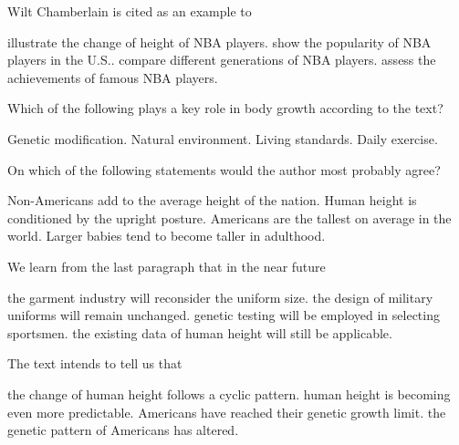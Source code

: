 \item Wilt Chamberlain is cited as an example to
\begin{tasks}
	\task illustrate the change of height of NBA players.
	\task show the popularity of NBA players in the U.S..
	\task compare different generations of NBA players.
	\task assess the achievements of famous NBA players.
\end{tasks}
\item Which of the following plays a key role in body growth according to the text?
\begin{tasks}
	\task Genetic modification.
	\task Natural environment.
	\task Living standards.
	\task Daily exercise.
\end{tasks}
\item On which of the following statements would the author most probably agree?
\begin{tasks}
	\task Non-Americans add to the average height of the nation.
	\task Human height is conditioned by the upright posture.
	\task Americans are the tallest on average in the world.
	\task Larger babies tend to become taller in adulthood.
\end{tasks}
\item We learn from the last paragraph that in the near future
\begin{tasks}
	\task the garment industry will reconsider the uniform size.
	\task the design of military uniforms will remain unchanged.
	\task genetic testing will be employed in selecting sportsmen.
	\task the existing data of human height will still be applicable.
\end{tasks}
\item The text intends to tell us that
\begin{tasks}
	\task the change of human height follows a cyclic pattern.
	\task human height is becoming even more predictable.
	\task Americans have reached their genetic growth limit.
	\task the genetic pattern of Americans has altered.
\end{tasks}